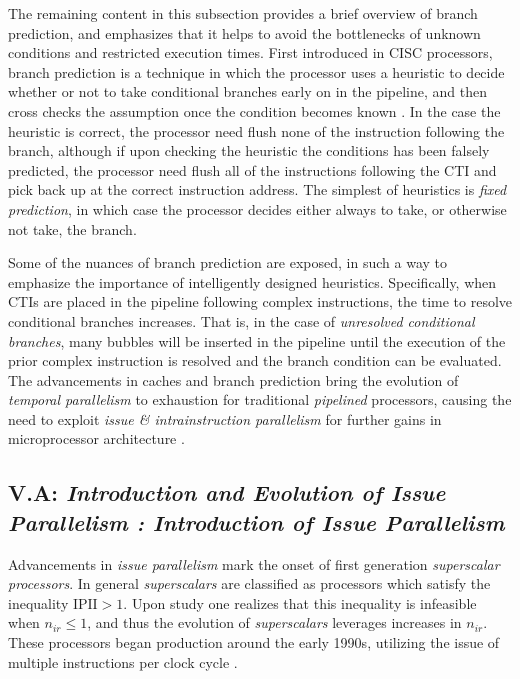 \documentclass{article}
\begin{document}
The remaining content in this subsection provides a brief overview of branch prediction, and emphasizes that it helps to avoid the bottlenecks of unknown conditions and restricted execution times.
First introduced in CISC processors, branch prediction is a technique in which the processor uses a heuristic to decide whether or not to take conditional branches early on in the pipeline, and then cross checks the assumption once the condition becomes known \cite{Sima}.
In the case the heuristic is correct, the processor need flush none of the instruction following the branch, although if upon checking the heuristic the conditions has been falsely predicted, the processor need flush all of the instructions following the CTI and pick back up at the correct instruction address.
The simplest of heuristics is \emph{fixed prediction}, in which case the processor decides either always to take, or otherwise not take, the branch.

Some of the nuances of branch prediction are exposed, in such a way to emphasize the importance of intelligently designed heuristics.
Specifically, when CTIs are placed in the pipeline following complex instructions, the time to resolve conditional branches increases.
That is, in the case of \emph{unresolved conditional branches}, many bubbles will be inserted in the pipeline until the execution of the prior complex instruction is resolved and the branch condition can be evaluated.
The advancements in caches and branch prediction bring the evolution of \emph{temporal parallelism} to exhaustion for traditional \emph{pipelined} processors, causing the need to exploit \emph{issue \& intrainstruction parallelism} for further gains in microprocessor architecture \cite{Sima}.

\subsection{\textbf{V.A}: \emph{Introduction and Evolution of Issue Parallelism : Introduction of Issue Parallelism}}
Advancements in \emph{issue parallelism} mark the onset of first generation \emph{superscalar processors}.
In general \emph{superscalars} are classified as processors which satisfy the inequality $\text{IPII} > 1$.
Upon study one realizes that this inequality is infeasible when $n_{ir} \le 1$, and thus the evolution of \emph{superscalars} leverages increases in $n_{ir}$.
These processors began production around the early 1990s, utilizing the issue of multiple instructions per clock cycle \cite{Sima}.
\end{document}
